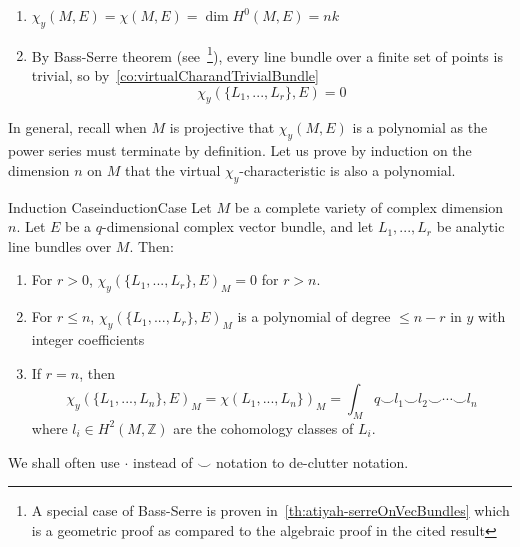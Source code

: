 \documentclass{ut-thesis}
\newenvironment{Proof}[1][]
  {\begin{ProofTcb}[#1]}
  {\end{ProofTcb}}
\newcommand{\Z}{{\mathbb{Z}}}
\begin{document}
\begin{Proof}
  \begin{enumerate}
    \item $\chi_y(M, E) = \chi(M,E) = \dim H^0(M, E) = nk$
    \item By Bass-Serre theorem (see~\cite{NateKTheory}\footnote{A special case of
      Bass-Serre is proven in~\cref{th:atiyah-serreOnVecBundles} which is a geometric proof as compared to the
    algebraic proof in the cited result}), every line bundle over a finite set of points is trivial, so by~\cref{co:virtualCharandTrivialBundle}
    \[
      \chi_y(\{L_1, ..., L_r\}, E) = 0
    \]
  \end{enumerate}
\end{Proof}


In general, recall when $M$ is projective that $\chi_y(M,E)$ is a polynomial as the power series must terminate by definition. Let us prove by
induction on the dimension $n$ on $M$ that the virtual $\chi_y$-characteristic is also a polynomial.

\begin{thm}{Induction Case}{inductionCase}
  Let $M$ be a complete variety of complex dimension $n$. Let $E$ be a $q$-dimensional complex vector
  bundle, and let $L_1, ..., L_r$ be analytic line bundles over $M$. Then:
  \begin{enumerate}
    \item For $r > 0$, $\chi_y(\{L_1, ..., L_r\}, E)_M = 0$ for $r > n$.
    \item For $r \le n$, $\chi_y(\{L_1, ..., L_r\}, E)_M$ is a polynomial of degree $\le n-r$ in $y$ with
      integer coefficients
     \item If $r = n$, then
       \[
       \chi_y(\{L_1, ..., L_n\}, E)_M = \chi(L_1, ..., L_n\})_M = \int_M q\smile l_1\smile l_2\smile \cdots \smile
       l_n
       \]
       where $l_i \in H^2(M, \Z)$ are the cohomology classes of $L_i$.
  \end{enumerate}
\end{thm}
We shall often use $\cdot$ instead of $\smile$ notation to de-clutter notation.
\end{document}
